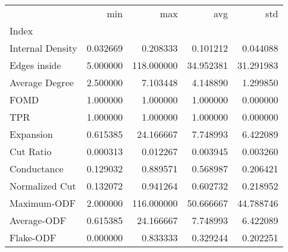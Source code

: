 \begin{tabular}{lrrrr}
\toprule
{} &       min &         max &        avg &        std \\
Index            &           &             &            &            \\
\midrule
Internal Density &  0.032669 &    0.208333 &   0.101212 &   0.044088 \\
Edges inside     &  5.000000 &  118.000000 &  34.952381 &  31.291983 \\
Average Degree   &  2.500000 &    7.103448 &   4.148890 &   1.299850 \\
FOMD             &  1.000000 &    1.000000 &   1.000000 &   0.000000 \\
TPR              &  1.000000 &    1.000000 &   1.000000 &   0.000000 \\
Expansion        &  0.615385 &   24.166667 &   7.748993 &   6.422089 \\
Cut Ratio        &  0.000313 &    0.012267 &   0.003945 &   0.003260 \\
Conductance      &  0.129032 &    0.889571 &   0.568987 &   0.206421 \\
Normalized Cut   &  0.132072 &    0.941264 &   0.602732 &   0.218952 \\
Maximum-ODF      &  2.000000 &  116.000000 &  50.666667 &  44.788746 \\
Average-ODF      &  0.615385 &   24.166667 &   7.748993 &   6.422089 \\
Flake-ODF        &  0.000000 &    0.833333 &   0.329244 &   0.202251 \\
\bottomrule
\end{tabular}
